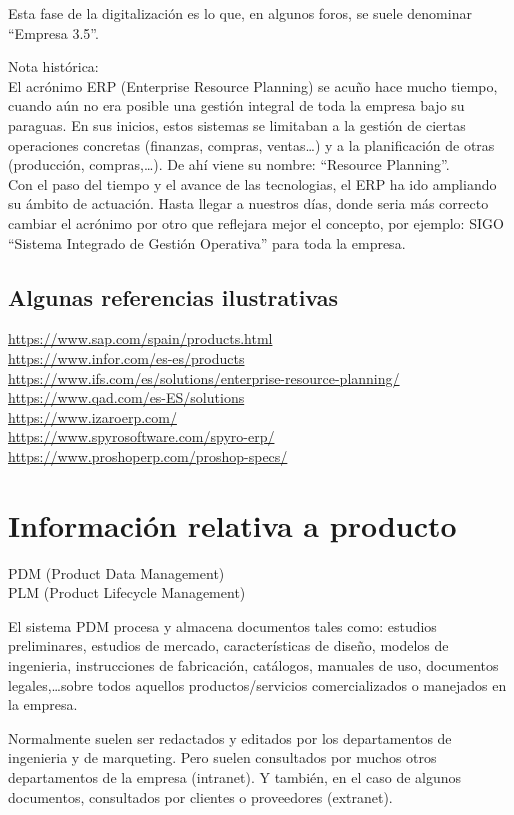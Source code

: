 \documentclass[spanish,12pt,a4paper,final,oneside]{book}
\begin{document}
Esta fase de la digitalización es lo que, en algunos foros, se suele denominar ``Empresa 3.5''.

Nota histórica:
\\El acrónimo ERP (Enterprise Resource Planning) se acuño hace mucho tiempo, cuando aún no era posible una gestión integral de toda la empresa bajo su paraguas. En sus inicios, estos sistemas se limitaban a la gestión de ciertas operaciones concretas (finanzas, compras, ventas\ldots) y a la planificación de otras (producción, compras,\ldots). De ahí viene su nombre: ``Resource Planning''.
\\Con el paso del tiempo y el avance de las tecnologias, el ERP ha ido ampliando su ámbito de actuación. Hasta llegar a nuestros días, donde seria más correcto cambiar el acrónimo por otro que reflejara mejor el concepto, por ejemplo: SIGO ``Sistema Integrado de Gestión Operativa'' para toda la empresa.

\subsection*{Algunas referencias ilustrativas}
\url{https://www.sap.com/spain/products.html}
\\ \url{https://www.infor.com/es-es/products}
\\ \url{https://www.ifs.com/es/solutions/enterprise-resource-planning/}
\\ \url{https://www.qad.com/es-ES/solutions}
\\ \url{https://www.izaroerp.com/}
\\ \url{https://www.spyrosoftware.com/spyro-erp/}
\\ \url{https://www.proshoperp.com/proshop-specs/}


\section{Información relativa a producto} \label{PDM}
PDM (Product Data Management)
\\ PLM (Product Lifecycle Management)

El sistema PDM procesa y almacena documentos tales como: estudios preliminares, estudios de mercado, características de diseño, modelos de ingenieria, instrucciones de fabricación, catálogos, manuales de uso, documentos legales,\ldots sobre todos aquellos productos/servicios comercializados o manejados en la empresa.

Normalmente suelen ser redactados y editados por los departamentos de ingenieria y de marqueting. Pero suelen consultados por muchos otros departamentos de la empresa (intranet). Y también, en el caso de algunos documentos, consultados por clientes o proveedores (extranet).
\end{document}
